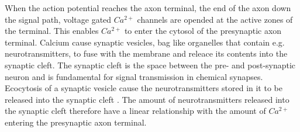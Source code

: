 
When the action potential reaches the axon terminal, the end of the axon down the signal path, 
	voltage gated $Ca^{2+}$ channels are opended at the active zones of the terminal.
This enables $Ca^{2+}$ to enter the cytosol of the presynaptic axon terminal\cite{PrinciplesOfNeuralScience4edKAP10}.
Calcium  cause synaptic vesicles, bag like organelles that contain e.g. neurotransmitters, to fuse with the membrane and releace its contents into the synaptic cleft.
The synaptic cleft is the space between the pre- and post-synaptic neuron and is fundamental for signal transmission in chemical synapses.
Ecocytosis of a synaptic vesicle cause the neurotransmitters stored in it to be released into the synaptic cleft \cite{PrinciplesOfNeuralScience4edKAP10}. 
The amount of neurotransmitters released into the synaptic cleft therefore have a linear relationship with the amount of $Ca^{2+}$ entering the presynaptic axon terminal.


